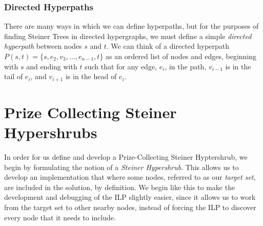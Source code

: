 \documentclass[12pt,twoside]{reedthesis}
\theoremstyle{definition}
\begin{document}
\subsection{Directed Hyperpaths}

There are many ways in which we can define hyperpaths, but for the purposes of finding Steiner Trees in directed hypergraphs, we must define a simple \textit{directed hyperpath} between nodes $s$ and $t$. We can think of a directed hyperpath $P(s,t)=\{s,e_2,v_3,...,e_{n-1},t\}$ as an ordered list of nodes and edges, beginning with $s$ and ending with $t$ such that for any edge, $e_i$, in the path, $v_{i-1}$ is in the tail of $e_i$, and $v_{i+1}$ is in the head of $e_i$.\par

\chapter{Prize Collecting Steiner Hypershrubs}

In order for us define and develop a Prize-Collecting Steiner Hyptershrub, we begin by formulating the notion of a \textit{Steiner Hypershrub}. This allows us to develop an implementation that where some nodes, referred to as our \textit{target set}, are included in the solution, by definition. We begin like this to make the development and debugging of the ILP slightly easier, since it allows us to work from the target set to other nearby nodes, instead of forcing the ILP to discover every node that it needs to include.\par
\end{document}
